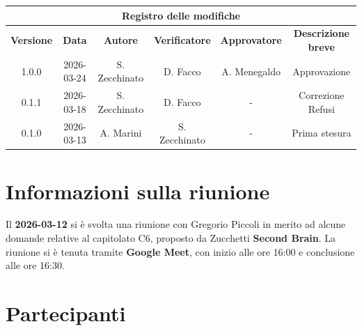 \documentclass[a4paper, 10pt, colorlinks=true, linkcolor=black, urlcolor=blue, citecolor=blue, hidelinks]{article}
\begin{document}
\newcommand{\tipoverbale}{esterno}
\newcommand{\dataverbale}{2026-03-12}
\newcommand{\dataversione}{2026-03-24}
\newcommand{\versione}{1.0.0}
\newcommand{\stato}{Approvato}
\newcommand{\destinatari}{The Bitless, prof. T. Vardanega, prof. R. Cardin, Zucchetti}




\newpage

\begin{center}
    \thispagestyle{empty}
    \begin{tabular}{|c|c|c|c|c|c|}
                    \hline
                    \multicolumn{6}{|c|}{\textbf{Registro delle modifiche}} \\
                    \hline
                    \textbf{Versione} & \textbf{Data} & \textbf{Autore}  & \textbf{Verificatore} & \textbf{Approvatore} & \textbf{Descrizione breve} \\
                    \hline
                    \versione & \dataversione & S. Zecchinato & D. Facco & A. Menegaldo & Approvazione \\
                    \hline 
                    0.1.1 & 2026-03-18 & S. Zecchinato & D. Facco & - & Correzione Refusi \\
                    \hline
                    0.1.0 & 2026-03-13 & A. Marini &  S. Zecchinato  & - & Prima stesura \\
                    \hline
                \end{tabular}
\end{center}

\newpage

\tableofcontents


\newpage
\section{Informazioni sulla riunione}
Il \textbf{2026-03-12} si è svolta una riunione con Gregorio Piccoli in merito ad alcune domande relative al capitolato C6, proposto da Zucchetti \textbf{Second Brain}. La riunione si è tenuta tramite \textbf{Google Meet}, con inizio alle ore 16:00 e conclusione alle ore 16:30.

\section{Partecipanti}
\end{document}
